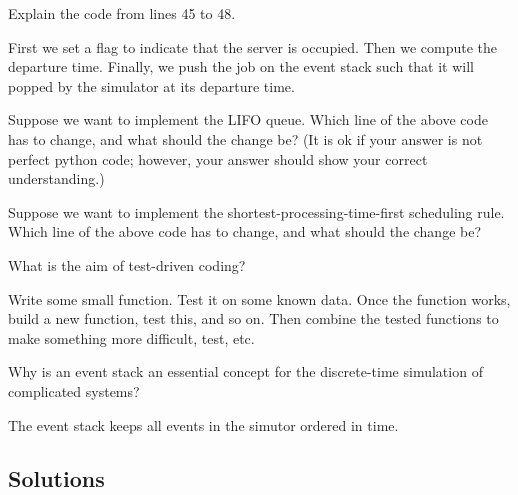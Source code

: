 \begin{exercise}[201907]
 Explain the code from lines 45 to 48.

\begin{solution}
  First we set a flag to indicate that the server is occupied.
  Then we compute the departure time.
  Finally, we push the job on the event stack such that it will popped by the simulator at its departure time.
\end{solution}
\end{exercise}              

\begin{exercise}[201907] 
Suppose we want to implement the LIFO queue. Which line of the above code has to change, and what should the change be? (It is ok if your answer is not perfect python code; however, your answer should show your correct understanding.) 

\begin{solution}
\end{solution}

\end{exercise}              

\begin{exercise}[201907] 
  Suppose we want to implement the shortest-processing-time-first scheduling rule.
  Which line of the above code has to change, and what should the change be?

\begin{solution}
\end{solution}
\end{exercise}              


\begin{exercise}[201907]
What is the aim of test-driven coding? 

\begin{solution}
  Write some small function.
  Test it on some known data.
  Once the function works, build a new function, test this, and so on.
  Then combine the tested functions to make something more difficult, test, etc.
\end{solution}
\end{exercise}

\begin{exercise}[201907]
  Why is an event stack an essential concept for the discrete-time simulation of complicated systems?

\begin{solution}
  The event stack keeps all events in the simutor ordered in time.
\end{solution}  
\end{exercise}

\subsection*{Solutions}




